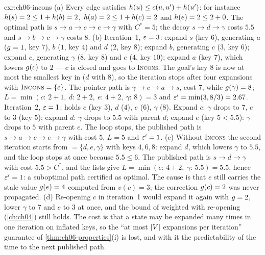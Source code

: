 \begin{solution}{exr:ch06-incons}
(a) Every edge satisfies $h(u) \le c(u,u') + h(u')$: for instance $h(s) = 2 \le 1 + h(b) = 2$, $h(a) = 2 \le 1 + h(c) = 2$ and $h(e) = 2 \le 2 + 0$. The optimal path is $s \to a \to c \to e \to \gamma$ with $C^* = 5$; the decoy $s \to d \to \gamma$ costs $5.5$ and $s \to b \to c \to \gamma$ costs $8$. (b) Iteration~1, $\varepsilon = 3$: expand $s$ (key $6$), generating $a$ ($g = 1$, key $7$), $b$ ($1$, key $4$) and $d$ ($2$, key $8$); expand $b$, generating $c$ ($3$, key $6$); expand $c$, generating $\gamma$ ($8$, key $8$) and $e$ ($4$, key $10$); expand $a$ (key $7$), which lowers $g(c)$ to $2$ --- $c$ is closed and goes to \textsc{Incons}. The goal's key $8$ is now at most the smallest key in \Open ($d$ with $8$), so the iteration stops after four expansions with $\textsc{Incons} = \{c\}$. The pointer path is $\gamma \to c \to a \to s$, cost $7$, while $g(\gamma) = 8$; $L = \min(c{:}\,2+1,\ d{:}\,2+2,\ e{:}\,4+2,\ \gamma{:}\,8) = 3$ and $\varepsilon' = \min(3, 8/3) = 2.67$. Iteration~2, $\varepsilon = 1$: \Open holds $c$ (key $3$), $d$ ($4$), $e$ ($6$), $\gamma$ ($8$). Expand $c$: $\gamma$ drops to $7$, $e$ to $3$ (key $5$); expand $d$: $\gamma$ drops to $5.5$ with parent $d$; expand $e$ (key $5 < 5.5$): $\gamma$ drops to $5$ with parent $e$. The loop stops, the published path is $s \to a \to c \to e \to \gamma$ with cost $5$, $L = 5$ and $\varepsilon' = 1$. (c) Without \textsc{Incons} the second iteration starts from \Open $= \{d, e, \gamma\}$ with keys $4, 6, 8$: expand $d$, which lowers $\gamma$ to $5.5$, and the loop stops at once because $5.5 \le 6$. The published path is $s \to d \to \gamma$ with cost $5.5 > C^*$, and the lists give $L = \min(e{:}\,4+2,\ \gamma{:}\,5.5) = 5.5$, hence $\varepsilon' = 1$: a suboptimal path certified as optimal. The cause is that $e$ still carries the stale value $g(e) = 4$ computed from $v(c) = 3$; the correction $g(c) = 2$ was never propagated. (d) Re-opening $c$ in iteration~1 would expand it again with $g = 2$, lower $\gamma$ to $7$ and $e$ to $3$ at once, and the bound of weighted \astar with re-opening (\cref{ch:ch04}) still holds. The cost is that a state may be expanded many times in one iteration on inflated keys, so the ``at most $\left\lvert V \right\rvert$ expansions per iteration'' guarantee of \cref{thm:ch06-properties}(i) is lost, and with it the predictability of the time to the next published path.
\end{solution}

